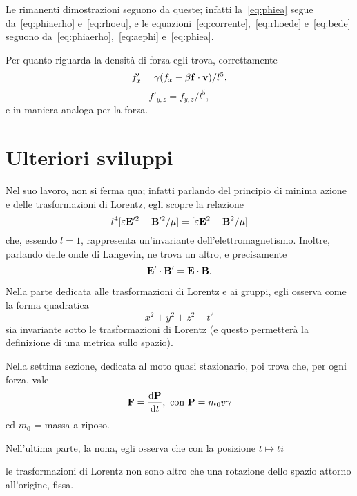 Le rimanenti dimostrazioni seguono da queste; infatti
la~\eqref{eq:phiea} segue da~\eqref{eq:phiaerho} e~\eqref{eq:rhoeu}, e
le equazioni~\eqref{eq:corrente},~\eqref{eq:rhoede} e~\eqref{eq:bede}
seguono da~\eqref{eq:phiaerho},~\eqref{eq:aephi} e~\eqref{eq:phiea}.

Per quanto riguarda la densit\`a di forza egli trova, correttamente
\begin{equation}
  f'_x = \gamma (f_x - \beta \mathbf{f \cdot v}) /l^5,
\label{eq:ftrax}
\end{equation}
\begin{equation}
  f'_{y,z} = f_{y,z}/l^5,
\label{eq:ftrayz}
\end{equation}
e in maniera analoga per la forza.

\section{Ulteriori sviluppi}
Nel suo lavoro, \poin{} non si ferma qua; infatti parlando del
principio di minima azione e delle trasformazioni di Lorentz, egli
scopre la relazione
\begin{equation}
  \label{eq:primoinv}
  l^4 [\varepsilon \mathbf{E}'^2 - \mathbf{B}'^2/\mu] = [\varepsilon
  \mathbf{E}^2 - \mathbf{B}^2/\mu] 
\end{equation}
che, essendo $l=1$, rappresenta un'invariante
dell'elettromagnetismo. Inoltre, parlando delle onde di Langevin,
ne trova un altro, e precisamente
\begin{equation}
  \label{eq:secondoinv}
  \mathbf{E'}\cdot\mathbf{B'} = \mathbf{E} \cdot \mathbf{B}.
\end{equation}

Nella parte dedicata alle trasformazioni di Lorentz e ai gruppi, egli
osserva come la forma quadratica
\begin{equation}
  \label{eq:ds}
  x^2 + y^2 + z^2 - t^2
\end{equation}
sia invariante sotto le trasformazioni di Lorentz (e questo permetter\`a
la definizione di una metrica sullo spazio).

Nella settima sezione, dedicata al moto quasi stazionario, \poin{} poi
trova che, per ogni forza, vale 
\begin{equation}
  \mathbf{F} = \frac{\mathrm{d} \mathbf{P}}{\mathrm{d} t}, 
   \mbox{ con } \mathbf{P} = m_0 v \gamma 
   \label{eq:forza_rel}
\end{equation}
ed \( m_0 \) = massa a riposo. 

Nell'ultima parte, la nona, egli osserva che con la posizione $ t\mapsto
t i $
\begin{citaz}
 le trasformazioni di Lorentz non sono altro che una rotazione dello
 spazio attorno all'origine, fissa.
\end{citaz} 


